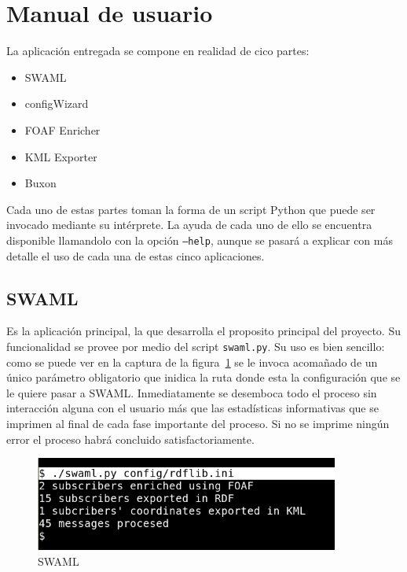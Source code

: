 
\section{Manual de usuario}

La aplicación entregada se compone en realidad de cico partes:

\begin{itemize}
 \item SWAML
 \item configWizard
 \item FOAF Enricher
 \item KML Exporter
 \item Buxon
\end{itemize}

Cada uno de estas partes toman la forma de un script Python que puede ser 
invocado mediante su intérprete. La ayuda de cada uno de ello se encuentra
disponible llamandolo con la opción \texttt{--help}, aunque se pasará a 
explicar con más detalle el uso de cada una de estas cinco aplicaciones.

\subsection*{SWAML}

Es la aplicación principal, la que desarrolla el proposito principal del
proyecto. Su funcionalidad se provee por medio del script \texttt{swaml.py}.
Su uso es bien sencillo: como se puede ver en la captura de la 
figura~\ref{fig:swaml} se le invoca acomañado de un único parámetro obligatorio 
que inidica la ruta donde esta la configuración que se le quiere pasar a 
SWAML. Inmediatamente se desemboca todo el proceso sin interacción
alguna con el usuario más que las estadísticas informativas que se 
imprimen al final de cada fase importante del proceso. Si no se
imprime ningún error el proceso habrá concluido satisfactoriamente.

\begin{figure}[H]
	\centering
	\includegraphics[width=10cm]{images/screenshots/swaml.png}
	\caption{SWAML}
	\label{fig:swaml}
\end{figure}

